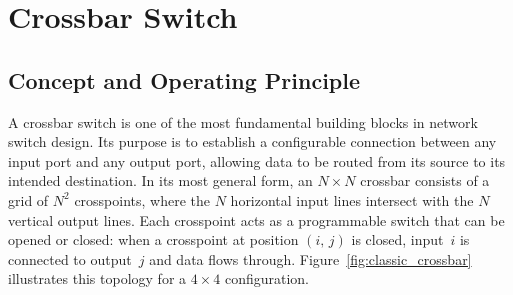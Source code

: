 
\section{Crossbar Switch}
\label{sec:crossbar}

\subsection{Concept and Operating Principle}
\label{subsec:crossbar_concept}

A crossbar switch is one of the most fundamental building blocks in network switch design.
Its purpose is to establish a configurable connection between any input port and any output port, 
allowing data to be routed from its source to its intended destination.
In its most general form, an $N \times N$ crossbar consists of a grid of $N^2$ crosspoints, 
where the $N$ horizontal input lines intersect with the $N$ vertical output lines.
Each crosspoint acts as a programmable switch that can be opened or closed: 
when a crosspoint at position $(i,\,j)$ is closed, input~$i$ is connected to output~$j$ 
and data flows through.
Figure~\ref{fig:classic_crossbar} illustrates this topology for a $4 \times 4$ configuration.

